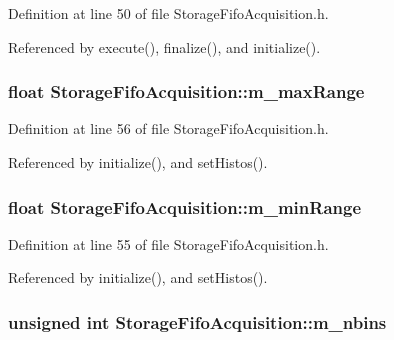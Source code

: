 Definition at line 50 of file StorageFifoAcquisition.h.

Referenced by execute(), finalize(), and initialize().\hypertarget{classStorageFifoAcquisition_adbe54adb957ea13ae6ff9e56b7e398c8}{
\subsubsection[{m\_\-maxRange}]{\setlength{\rightskip}{0pt plus 5cm}float {\bf StorageFifoAcquisition::m\_\-maxRange}}}
\label{classStorageFifoAcquisition_adbe54adb957ea13ae6ff9e56b7e398c8}


Definition at line 56 of file StorageFifoAcquisition.h.

Referenced by initialize(), and setHistos().\hypertarget{classStorageFifoAcquisition_ad3cf1ef4173ffe14a0e86b7b8ec8d90b}{
\subsubsection[{m\_\-minRange}]{\setlength{\rightskip}{0pt plus 5cm}float {\bf StorageFifoAcquisition::m\_\-minRange}}}
\label{classStorageFifoAcquisition_ad3cf1ef4173ffe14a0e86b7b8ec8d90b}


Definition at line 55 of file StorageFifoAcquisition.h.

Referenced by initialize(), and setHistos().\hypertarget{classStorageFifoAcquisition_af5f50ba5a71654324d96eddc4d578571}{
\subsubsection[{m\_\-nbins}]{\setlength{\rightskip}{0pt plus 5cm}unsigned int {\bf StorageFifoAcquisition::m\_\-nbins}}}
\label{classStorageFifoAcquisition_af5f50ba5a71654324d96eddc4d578571}



